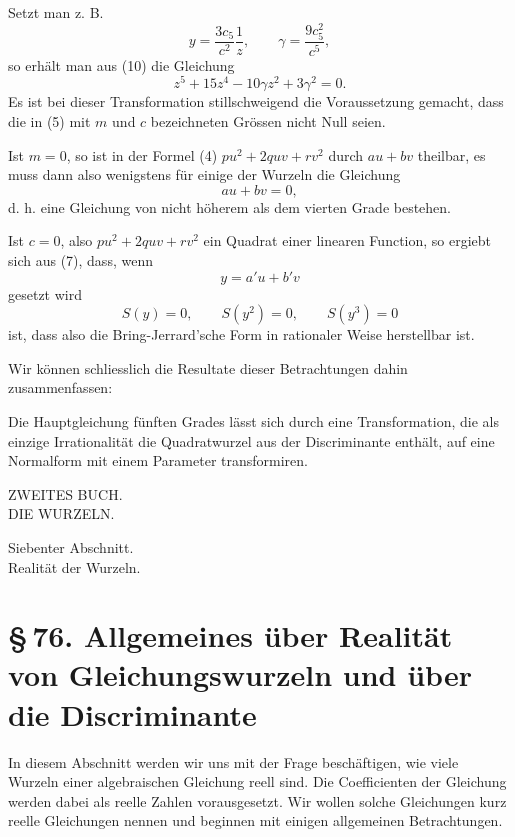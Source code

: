 \documentclass[11pt]{article}
\providecommand{\sect}[2]{\section*{\S\,#1. #2}}
\begin{document}
Setzt man z. B.
\begin{equation}
 y=\frac{3c_5}{c^2}\frac1z,
 \qquad
 \gamma=\frac{9c_5^2}{c^5},
\tag{13}
\end{equation}
so erhält man aus (10) die Gleichung
\begin{equation}
 z^5+15z^4-10\gamma z^2+3\gamma^2=0.
\tag{14}
\end{equation}
Es ist bei dieser Transformation stillschweigend die Voraussetzung gemacht, dass die in (5) mit $m$ und $c$ bezeichneten Grössen nicht Null seien.

Ist $m=0$, so ist in der Formel (4) $pu^2+2quv+rv^2$ durch $au+bv$ theilbar, es muss dann also wenigstens für einige der Wurzeln die Gleichung
\[
 au+bv=0,
\]
d. h. eine Gleichung von nicht höherem als dem vierten Grade bestehen.

Ist $c=0$, also $pu^2+2quv+rv^2$ ein Quadrat einer linearen Function, so ergiebt sich aus (7), dass, wenn
\[
 y=a'u+b'v
\]
gesetzt wird
\[
 S(y)=0,\qquad S(y^2)=0,
 \qquad S(y^3)=0
\]
ist, dass also die Bring-Jerrard'sche Form in rationaler Weise herstellbar ist.

Wir können schliesslich die Resultate dieser Betrachtungen dahin zusammenfassen:

Die Hauptgleichung fünften Grades lässt sich durch eine Transformation, die als einzige Irrationalität die Quadratwurzel aus der Discriminante enthält, auf eine Normalform mit einem Parameter transformiren.






\begin{center}
{\Large ZWEITES BUCH.}\\[1.6em]
{\LARGE DIE WURZELN.}
\end{center}
\clearpage

\begin{center}
{\large Siebenter Abschnitt.}\\[0.6em]
{\Large Realit\"at der Wurzeln.}
\end{center}

\sect{76}{Allgemeines \"uber Realit\"at von Gleichungswurzeln und \"uber die Discriminante}

In diesem Abschnitt werden wir uns mit der Frage besch\"aftigen, wie viele Wurzeln einer algebraischen Gleichung reell sind. Die Coefficienten der Gleichung werden dabei als reelle Zahlen vorausgesetzt. Wir wollen solche Gleichungen kurz reelle Gleichungen nennen und beginnen mit einigen allgemeinen Betrachtungen.
\end{document}
